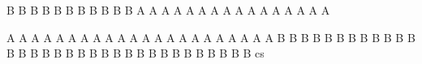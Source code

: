 
B
B
B
B
B
B
B
B
B
B
B
A
A
A
A
A
A
A
A
A
A
A
A
A
A
A
A

A
A
A
A
A
A
A
A
A
A
A
A
A
A
A
A
A
A
A
A
A
A
B
B
B
B
B
B
B
B
B
B
B
B
B
B
B
B
B
B
B
B
B
B
B
B
B
B
B
B
B
B
B
B
B
cs











